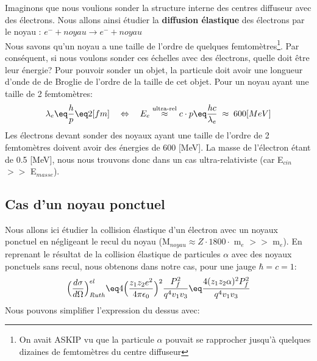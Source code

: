 Imaginons que nous voulions sonder la structure interne des centres diffuseur avec des électrons. Nous allons ainsi étudier la \textbf{diffusion élastique} des électrons par le noyau : $e^- + noyau \rightarrow e^- + noyau$\\
Nous savons qu'un noyau a une taille de l'ordre de quelques femtomètres\footnote{On avait ASKIP vu que la particule $\alpha$ pouvait se rapprocher jusqu'à quelques dizaines de femtomètres du centre diffuseur}. Par conséquent, si nous voulons sonder ces échelles avec des électrons, quelle doit être leur énergie? Pour pouvoir sonder un objet, la particule doit avoir une longueur d'onde de de Broglie de l'ordre de la taille de cet objet. Pour un noyau ayant une taille de 2 femtomètres:
\begin{equation}
    \lambda_e \eq \dfrac{h}{p} \eq 2[fm]
    \quad \Leftrightarrow \quad
    E_e \stackrel{\text{ultra-rel}}{\approx}c\cdot p \eq \dfrac{hc}{\lambda_e} 
    \; \approx \;
    600 [MeV]
\end{equation}
Les électrons devant sonder des noyaux ayant une taille de l'ordre de 2 femtomètres doivent avoir des énergies de 600 [MeV]. La masse de l'électron étant de 0.5 [MeV], nous nous trouvons donc dans un cas ultra-relativiste (car E$_{cin}$ $>>$ E$_{masse}$).


\subsection{Cas d'un noyau ponctuel}


Nous allons ici étudier la collision élastique d'un électron avec un noyaux ponctuel en négligeant le recul du noyau (M$_{noyau}\approx Z \cdot 1800 \cdot$ m$_e$ $>>$ m$_e$). En reprenant le résultat de la collision élastique de particules $\alpha$ avec des noyaux ponctuels sans recul, nous obtenons dans notre cas, pour une jauge $\hbar=c=1$:
\begin{equation*}
    \Big(  \dfrac{d\sigma}{d\Omega} \Big)_{Ruth}^{el}
    \eq
    4 \Big( \dfrac{z_1 z_2e^2}{4\pi\epsilon_0} \Big)^2 \dfrac{P_f^2}{q^4v_1v_3}
    \eq
    \dfrac{4 (z_1 z_2 \alpha)^2 P_f^2}{q^4v_1v_3}
\end{equation*}
Nous pouvons simplifier l'expression du dessus avec:

